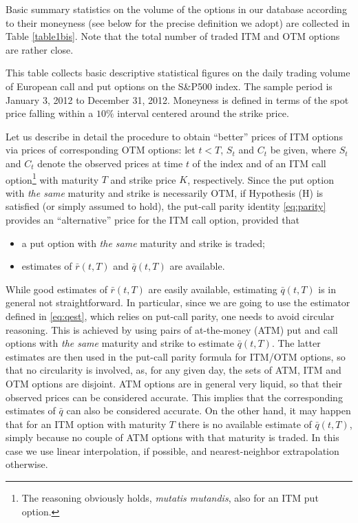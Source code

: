 \documentclass[11pt]{article}
\theoremstyle{remark}
\begin{document}
Basic summary statistics on the volume of the options in our database
according to their moneyness (see below for the precise definition we
adopt) are collected in Table \ref{table1bis}. Note that the total
number of traded ITM and OTM options are rather close.

\begin{table}[tbp]
\caption{Statistics on the daily volume for S\&P500 index options}
\begin{center}
\vspace{2mm}
\parbox{\textwidth}{\footnotesize This table collects basic
  descriptive statistical figures on the daily trading volume of
  European call and put options on the S\&P500 index. The sample
  period is January 3, 2012 to December 31, 2012. Moneyness is defined
  in terms of the spot price falling within a $10\%$ interval centered
  around the strike price.  \vspace{4mm}}
\footnotesize{{}}
\end{center}
\label{table1bis}
\end{table}

Let us describe in detail the procedure to obtain ``better'' prices of
ITM options via prices of corresponding OTM options: let $t<T$, $S_t$
and $C_t$ be given, where $S_t$ and $C_t$ denote the observed prices
at time $t$ of the index and of an ITM call option\footnote{The
  reasoning obviously holds, \emph{mutatis mutandis}, also for an ITM
  put option.} with maturity $T$ and strike price $K$,
respectively. Since the put option with \emph{the same} maturity and
strike is necessarily OTM, if Hypothesis (H) is satisfied (or simply
assumed to hold), the put-call parity identity \eqref{eq:parity}
provides an ``alternative'' price for the ITM call option, provided
that
\begin{itemize}
\item[(a)] a put option with \emph{the same} maturity and strike is
  traded;
\item[(b)] estimates of $\bar{r}(t,T)$ and $\bar{q}(t,T)$ are
  available.
\end{itemize}
While good estimates of $\bar{r}(t,T)$ are easily available,
estimating $\bar{q}(t,T)$ is in general not straightforward. In
particular, since we are going to use the estimator defined in
\eqref{eq:qest}, which relies on put-call parity, one needs to avoid
circular reasoning. This is achieved by using pairs of at-the-money
(ATM) put and call options with \emph{the same} maturity and strike to
estimate $\bar{q}(t,T)$. The latter estimates are then used in the
put-call parity formula for ITM/OTM options, so that no circularity is
involved, as, for any given day, the sets of ATM, ITM and OTM options
are disjoint. ATM options are in general very liquid, so that their
observed prices can be considered accurate. This implies that the
corresponding estimates of $\bar{q}$ can also be considered
accurate. On the other hand, it may happen that for an ITM option with
maturity $T$ there is no available estimate of $\bar{q}(t,T)$, simply
because no couple of ATM options with that maturity is traded. In this
case we use linear interpolation, if possible, and nearest-neighbor
extrapolation otherwise.
\end{document}
